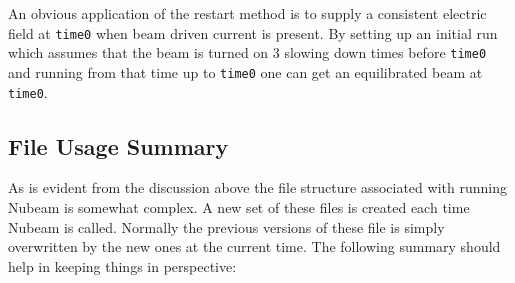     An obvious application of the restart method is to supply a
    consistent  electric field  at \texttt{time0} when beam driven current 
   is present. By setting up an initial run which assumes that the
   beam is turned on 3 slowing down times before \texttt{time0} and running
   from that time up to \texttt{time0} one can get an equilibrated beam at \texttt{time0}.



   \subsection{File Usage  Summary}
  As is evident from the discussion above the file structure
  associated  with running Nubeam is
  somewhat complex. A new set of these files is created each time
  Nubeam  is called. Normally the previous versions of these file is
  simply overwritten by the new  ones at the  current time. 
  The following summary  should help in keeping things in
  perspective:
